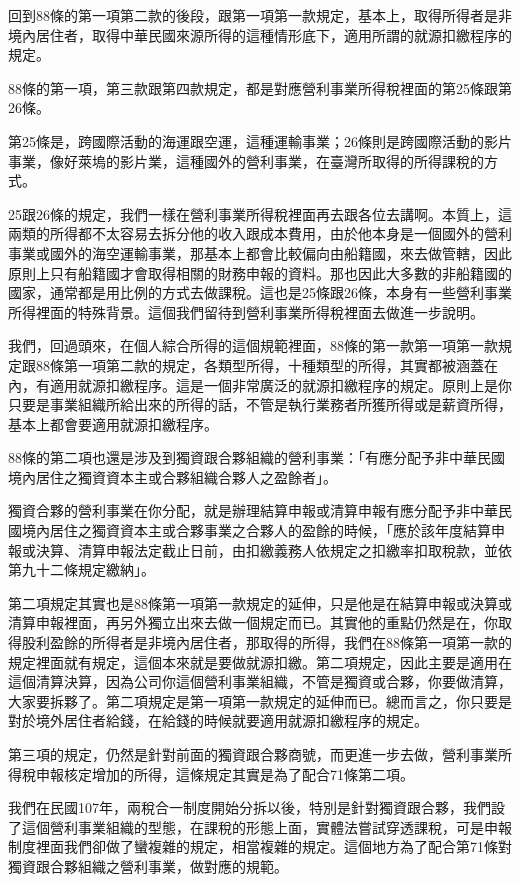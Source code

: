 \documentclass[]{ctexbook}
\begin{document}
回到88條的第一項第二款的後段，跟第一項第一款規定，基本上，取得所得者是非境內居住者，取得中華民國來源所得的這種情形底下，適用所謂的就源扣繳程序的規定。

88條的第一項，第三款跟第四款規定，都是對應營利事業所得稅裡面的第25條跟第26條。

第25條是，跨國際活動的海運跟空運，這種運輸事業；26條則是跨國際活動的影片事業，像好萊塢的影片業，這種國外的營利事業，在臺灣所取得的所得課稅的方式。

25跟26條的規定，我們一樣在營利事業所得稅裡面再去跟各位去講啊。本質上，這兩類的所得都不太容易去拆分他的收入跟成本費用，由於他本身是一個國外的營利事業或國外的海空運輸事業，那基本上都會比較偏向由船籍國，來去做管轄，因此原則上只有船籍國才會取得相關的財務申報的資料。那也因此大多數的非船籍國的國家，通常都是用比例的方式去做課稅。這也是25條跟26條，本身有一些營利事業所得裡面的特殊背景。這個我們留待到營利事業所得稅裡面去做進一步說明。

我們，回過頭來，在個人綜合所得的這個規範裡面，88條的第一款第一項第一款規定跟88條第一項第二款的規定，各類型所得，十種類型的所得，其實都被涵蓋在內，有適用就源扣繳程序。這是一個非常廣泛的就源扣繳程序的規定。原則上是你只要是事業組織所給出來的所得的話，不管是執行業務者所獲所得或是薪資所得，基本上都會要適用就源扣繳程序。

88條的第二項也還是涉及到獨資跟合夥組織的營利事業：「有應分配予非中華民國境內居住之獨資資本主或合夥組織合夥人之盈餘者」。

獨資合夥的營利事業在你分配，就是辦理結算申報或清算申報有應分配予非中華民國境內居住之獨資資本主或合夥事業之合夥人的盈餘的時候，「應於該年度結算申報或決算、清算申報法定截止日前，由扣繳義務人依規定之扣繳率扣取稅款，並依第九十二條規定繳納」。

第二項規定其實也是88條第一項第一款規定的延伸，只是他是在結算申報或決算或清算申報裡面，再另外獨立出來去做一個規定而已。其實他的重點仍然是在，你取得股利盈餘的所得者是非境內居住者，那取得的所得，我們在88條第一項第一款的規定裡面就有規定，這個本來就是要做就源扣繳。第二項規定，因此主要是適用在這個清算決算，因為公司你這個營利事業組織，不管是獨資或合夥，你要做清算，大家要拆夥了。第二項規定是第一項第一款規定的延伸而已。總而言之，你只要是對於境外居住者給錢，在給錢的時候就要適用就源扣繳程序的規定。

第三項的規定，仍然是針對前面的獨資跟合夥商號，而更進一步去做，營利事業所得稅申報核定增加的所得，這條規定其實是為了配合71條第二項。

我們在民國107年，兩稅合一制度開始分拆以後，特別是針對獨資跟合夥，我們設了這個營利事業組織的型態，在課稅的形態上面，實體法嘗試穿透課稅，可是申報制度裡面我們卻做了蠻複雜的規定，相當複雜的規定。這個地方為了配合第71條對獨資跟合夥組織之營利事業，做對應的規範。
\end{document}
